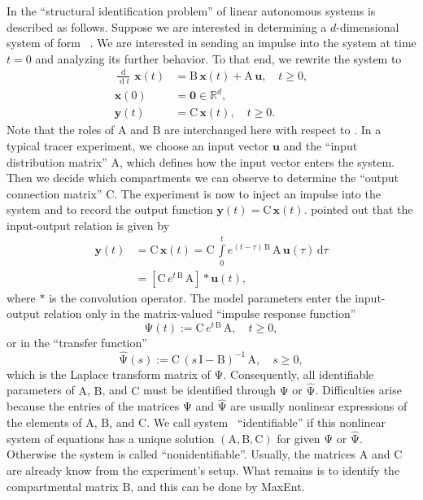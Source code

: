 \documentclass[smallextended]{svjour3}
\makeatletter
\renewcommand*{\eqref}[1]{%
  \hyperref[{#1}]{\textup{\tagform@{\ref*{#1}}}}%
}
\renewcommand{\tens}[1]{\mathrm{#1}}
\renewcommand{\vec}[1]{\mathbf{#1}}
\newcommand{\R}{\mathbb{R}}
\newcommand{\intl}{\int\limits}
\newcommand{\deriv}[1]{\frac{\operatorname{d}}{\operatorname{d}#1}}
\newcommand{\dd}[1]{\,\mathrm{d}#1}
\renewcommand{\emph}[1]{``#1''}
\makeatother
\begin{document}
In \citet[Chapter~16]{Anderson1983} the \emph{structural identification problem} of linear autonomous systems is described as follows.
Suppose we are interested in determining a $d$-dimensional system of form~\eqref{eqn:lin_CS_sys}.
We are interested in sending an impulse into the system at time $t=0$ and analyzing its further behavior.
To that end, we rewrite the system to
\begin{equation}\label{eqn:ABC_system}
	\begin{aligned}
		\deriv{t}\,\vec{x}(t) &= \tens{B}\,\vec{x}(t) + \tens{A}\,\vec{u},	\quad t\geq0,\\
		\vec{x}(0) &= \vec{0}\in\R^d,\\
		\vec{y}(t) &= \tens{C}\,\vec{x}(t),\quad t\geq0.
	\end{aligned}
\end{equation}
Note that the roles of $\tens{A}$ and $\tens{B}$ are interchanged here with respect to \citet{Anderson1983}.
In a typical tracer experiment, we choose an input vector $\vec{u}$ and the \emph{input distribution matrix} $\tens{A}$, which defines how the input vector enters the system.
Then we decide which compartments we can observe to determine the \emph{output connection matrix} $\tens{C}$.
The experiment is now to inject an impulse into the system and to record the output function $\vec{y}(t) =\tens{C}\,\vec{x}(t)$.
\citet{Bellman1970MBS} pointed out that the input-output relation is given by
\begin{align*}
	\vec{y}(t) &= \tens{C}\,\vec{x}(t) = \tens{C}\,\intl_0^t e^{(t-\tau)\,\tens{B}}\,\tens{A}\,\vec{u}(\tau)\dd{\tau}\\
	&= \left[\tens{C}\,e^{t\,\tens{B}}\,\tens{A}\right] * \vec{u}(t),
\end{align*}
where $*$ is the convolution operator.
The model parameters enter the input-output relation only in the matrix-valued \emph{impulse response function}
\begin{equation}
	\tens{\Psi}(t):=\tens{C}\,e^{t\,\tens{B}}\,\tens{A},\quad t\geq0,
\end{equation}
or in the \emph{transfer function}
\begin{equation}
	\widehat{\tens{\Psi}}(s) := \tens{C}\,(s\,\tens{I}-\tens{B})^{-1}\,\tens{A}, \quad s\geq0,
\end{equation}
which is the Laplace transform matrix of $\tens{\Psi}$.
Consequently, all identifiable parameters of $\tens{A}$, $\tens{B}$, and $\tens{C}$ must be identified through $\tens{\Psi}$ or $\widehat{\tens{\Psi}}$.
Difficulties arise because the entries of the matrices $\tens{\Psi}$ and $\widehat{\tens{\Psi}}$ are usually nonlinear expressions of the elements of $\tens{A}$, $\tens{B}$, and $\tens{C}$.
We call system~\eqref{eqn:ABC_system} \emph{identifiable} if this nonlinear system of equations has a unique solution $(\tens{A},\tens{B},\tens{C})$ for given $\tens{\Psi}$ or $\widehat{\tens{\Psi}}$.
Otherwise the system is called \emph{nonidentifiable}.
Usually, the matrices $\tens{A}$ and $\tens{C}$ are already know from the experiment's setup.
What remains is to identify the compartmental matrix $\tens{B}$, and this can be done by MaxEnt.
\end{document}
